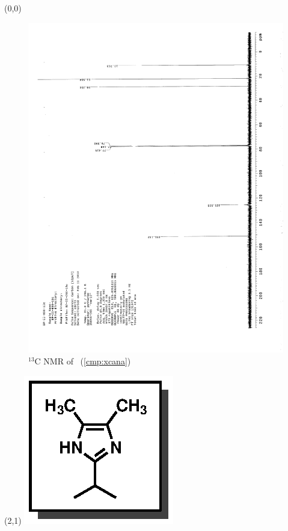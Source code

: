 \clearpage
\begin{textblock}{20}(0,0)
\begin{figure}[htb]
\caption{$^{13}$C NMR of  \CMPxcana\ (\ref{cmp:xcana})}
\includegraphics[scale=0.75, trim = 0mm 0mm 0mm 5mm,
clip]{chp_alkylation/images/nmr/xcanaC}
\vspace{-100pt}
\end{figure}
\end{textblock}
\begin{textblock}{1}(2,1)
\includegraphics[scale=0.8, angle=90]{chp_alkylation/images/xcana}
\end{textblock}
\clearpage

